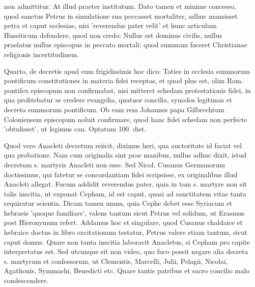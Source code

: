 non admittitur. At illud praeter institutum. Dato tamen et minime concesso, quod sanctus Petrus in simulatione sua peccasset mortaliter, adhuc mansisset petra et caput ecclesiae, nisi 'reverendus pater velit' et hunc articulum Hussiticum defendere, quod non credo: Nullus est dominus civilis, nullus praelatus nullus episcopus in peccato mortali; quod summam faceret Christianae religionis incertitudinem.

Quarto, de decretis apud eum frigidissimis hoc dico: Toties in ecclesia summorum pontificum constitutiones in materia fidei receptas, et quod plus est, olim Rom. pontifex episcopum non confirmabat, nisi mitteret schedam protestationis fidei, in qua profitebatur se credere evangelia, quatuor concilia, synodos legitimas et decreta summorum pontificum. Ob eam rem Johannes papa Gilbrechtum Coloniensem episcopum noluit confirmare, quod hanc fidei schedam non perfecte 'obtulisset', ut legimus can. Optatum 100. dist.

Quod vero Anacleti decretum reiicit, diximus heri, qua auctoritate id faciat vel qua probatione. Nam cum originalia sint prae manibus, nullus adhuc dixit, istud decretum s. martyris Anacleti non esse. Sed Nicol. Cusanus Germanorum doctissimus, qui fatetur se concordantiam fidei scripsisse, ex originalibus illud Anacleti allegat. Fucum addidit reverendus pater, quia in tam s. martyre non sit talis inscitia, ut exponat Cepham, id est caput, quasi ad sanctitatem vitae tanta requiratur scientia. Dicam tamen unum, quia Cephe debet esse Syriacum et hebraeis 'quoque familiare', valens tantum sicut Petrus vel solidum, ut Erasmus post Hieronymum refert. Addamus hoc et singulare, quod Cusanus chaldaice et hebraice doctus in libro excitationum testatur, Petrus valere etiam tantum, sicut caput domus. Quare non tanta inscitia laboravit Anacletus, si Cepham pro capite interpretatus est. Sed utcunque sit non video, quo fuco possit negare alia decreta s. martyrum et confessorum, ut Clementis, Marcelli, Julii, Pelagii, Nicolai, Agathonis, Symmachi, Benedicti etc. Quare tantis patribus et sacro concilio malo condescendere.

